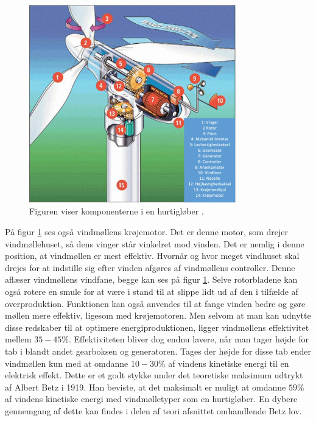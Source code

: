 \begin{figure}[H]
\centering
\includegraphics[width=0.80\textwidth]{Billeder/vindmollen}
\caption{Figuren viser komponenterne i en hurtigløber \citep{windturbine}.}
\label{fig:vindmollen}
\end{figure}

På figur \ref{fig:vindmollen} ses også vindmøllens krøjemotor. Det er denne motor, som drejer vindmøllehuset, så dens vinger står vinkelret mod vinden. Det er nemlig i denne position, at vindmøllen er mest effektiv. Hvornår og hvor meget vindhuset skal drejes for at indstille sig efter vinden afgøres af vindmøllens controller. Denne aflæser vindmøllens vindfane, begge kan ses på figur \ref{fig:vindmollen}. Selve rotorbladene kan også rotere en smule for at være i stand til  at slippe lidt ud af den i tilfælde af overproduktion. Funktionen kan også anvendes til at fange vinden bedre og gøre møllen mere effektiv, ligesom med krøjemotoren. 
Men selvom at man kan udnytte disse redskaber til at optimere energiproduktionen, ligger vindmøllens effektivitet mellem $35-45 \%$.
Effektiviteten bliver dog endnu lavere, når man tager højde for tab i blandt andet gearboksen og generatoren. Tages der højde for disse tab ender vindmøllen kun med at omdanne $10-30 \%$ af vindens kinetiske energi til en elektrisk effekt.
Dette er et godt stykke under det teoretiske maksimum udtrykt af Albert Betz i 1919. Han beviste, at det maksimalt er muligt at omdanne $59 \%$ af vindens kinetiske energi med vindmølletyper som en hurtigløber. En dybere gennemgang af dette kan findes i delen af teori afsnittet omhandlende Betz lov. 


